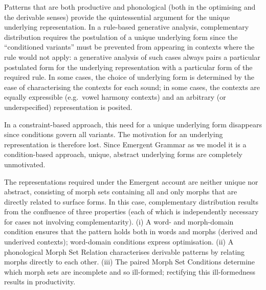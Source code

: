 Patterns that are both productive and phonological (both in the optimising and the derivable senses) provide the quintessential argument for the unique underlying representation. In a rule-based generative analysis, complementary distribution requires the postulation of a unique underlying form since the ``conditioned variants'' must be prevented from appearing in contexts where the rule would not apply: a generative analysis of such cases always pairs a particular postulated form for the underlying representation with a particular form of the required rule. In some cases, the choice of underlying form is determined by the ease of characterising the contexts for each sound; in some cases, the contexts are equally expressible (e.g.\ vowel harmony contexts) and an arbitrary (or underspecified) representation is posited.

 In a constraint-based approach, this need for a unique underlying form disappears since conditions govern all  variants. The motivation for an underlying representation is therefore lost.  Since Emergent Grammar as we model it is a condition-based approach, unique, abstract underlying forms are completely unmotivated. 
 

The representations required under the Emergent account are neither unique nor abstract, consisting of morph sets containing all and only morphs that are directly related to surface forms. In this case, complementary distribution results from  the confluence of three properties (each of which is independently necessary for cases not involving complementarity). (i) A word- and morph-domain condition ensures that the pattern holds both in words and morphs (derived and underived contexts); word-domain conditions express optimisation. (ii)  A phonological Morph Set Relation characterises  derivable patterns by relating morphs directly to each other. (iii) The paired Morph Set Conditions determine which morph sets are incomplete and so ill-formed; rectifying this ill-formedness results in productivity.



